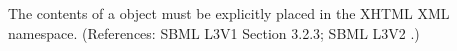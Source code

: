 The contents of a \Notes object must be explicitly placed in the
XHTML XML namespace.  (References: SBML L3V1 Section 3.2.3; SBML L3V2 .)
